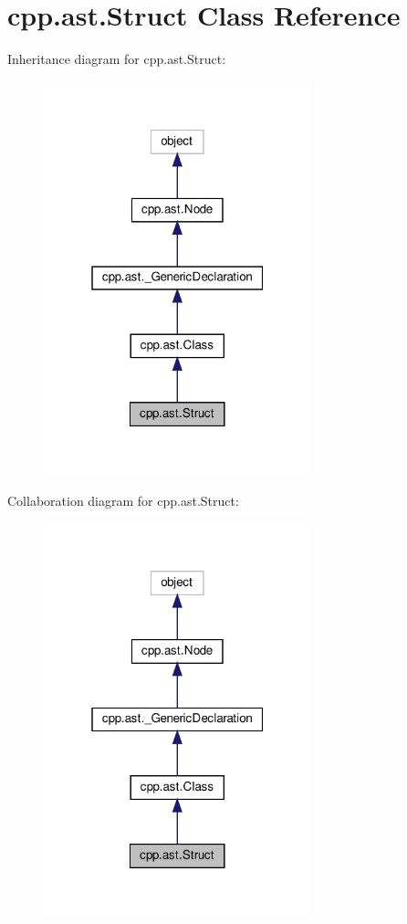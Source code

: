 \hypertarget{classcpp_1_1ast_1_1_struct}{}\section{cpp.\+ast.\+Struct Class Reference}
\label{classcpp_1_1ast_1_1_struct}


Inheritance diagram for cpp.\+ast.\+Struct\+:
\nopagebreak
\begin{figure}[H]
\begin{center}
\leavevmode
\includegraphics[width=220pt]{classcpp_1_1ast_1_1_struct__inherit__graph}
\end{center}
\end{figure}


Collaboration diagram for cpp.\+ast.\+Struct\+:
\nopagebreak
\begin{figure}[H]
\begin{center}
\leavevmode
\includegraphics[width=220pt]{classcpp_1_1ast_1_1_struct__coll__graph}
\end{center}
\end{figure}
